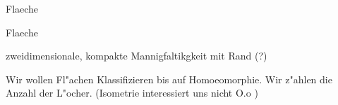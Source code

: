 \documentclass[class=article, crop=false]{standalone}
\begin{document}
\begin{zettel}{Flaeche}
\begin{flashcard}[b4v5os3y]{Flaeche}
	\begin{definition}[Fl"ache]
		zweidimensionale, kompakte Mannigfaltikgkeit mit Rand (?)
	\end{definition}
	Wir wollen Fl"achen Klassifizieren bis auf Homoeomorphie. Wir z"ahlen die Anzahl der L"ocher. (Isometrie interessiert uns nicht O.o )
\end{flashcard}

\end{zettel}
\end{document}
